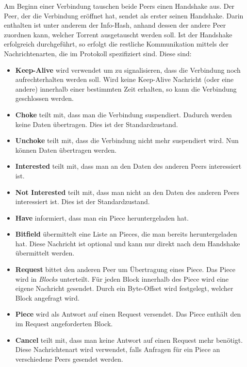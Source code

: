 Am Beginn einer Verbindung tauschen beide Peers einen Handshake aus. Der Peer, der die Verbindung eröffnet hat, sendet als erster seinen Handshake. Darin enthalten ist unter anderem der Info-Hash, anhand dessen der andere Peer zuordnen kann, welcher Torrent ausgetauscht werden soll. Ist der Handshake erfolgreich durchgeführt, so erfolgt die restliche Kommunikation mittels der Nachrichtenarten, die im Protokoll spezifiziert sind. Diese sind: 
\begin{itemize}
    \item \textbf{Keep-Alive} wird verwendet um zu signalisieren, dass die Verbindung noch aufrechterhalten werden soll. Wird keine Keep-Alive Nachricht (oder eine andere) innerhalb einer bestimmten Zeit erhalten, so kann die Verbindung geschlossen werden. 
    \item \textbf{Choke} teilt mit, dass man die Verbindung suspendiert. Dadurch werden keine Daten übertragen. Dies ist der Standardzustand.
    \item \textbf{Unchoke} teilt mit, dass die Verbindung nicht mehr suspendiert wird. Nun können Daten übertragen werden.
    \item \textbf{Interested} teilt mit, dass man an den Daten des anderen Peers interessiert ist.
    \item \textbf{Not Interested} teilt mit, dass man nicht an den Daten des anderen Peers interessiert ist. Dies ist der Standardzustand.
    \item \textbf{Have} informiert, dass man ein Piece heruntergeladen hat. 
    \item \textbf{Bitfield} übermittelt eine Liste an Pieces, die man bereits heruntergeladen hat. Diese Nachricht ist optional und kann nur direkt nach dem Handshake übermittelt werden. 
    \item \textbf{Request} bittet den anderen Peer um Übertragung eines Piece. Das Piece wird in \emph{Blocks} unterteilt. Für jeden Block innerhalb des Piece wird eine eigene Nachricht gesendet. Durch ein Byte-Offset wird festgelegt, welcher Block angefragt wird.
    \item \textbf{Piece} wird als Antwort auf einen Request versendet. Das Piece enthält den im Request angeforderten Block.
    \item \textbf{Cancel} teilt mit, dass man keine Antwort auf einen Request mehr benötigt. Diese Nachrichtenart wird verwendet, falls Anfragen für ein Piece an verschiedene Peers gesendet werden.
\end{itemize}


